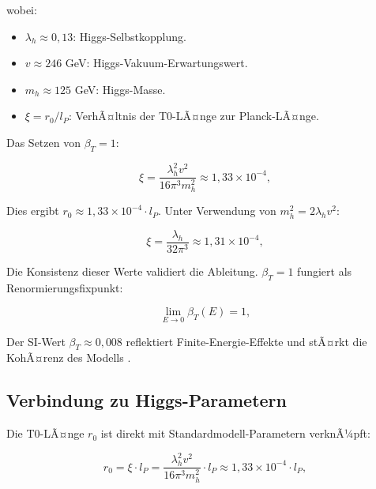 ﻿\documentclass[twocolumn,aps,prl]{revtex4-2}
\begin{document}
{{{{{{{{{										wobei:
										\begin{itemize}
											\item \(\lambda_h \approx 0{,}13\): Higgs-Selbstkopplung.
											\item \(v \approx 246\) GeV: Higgs-Vakuum-Erwartungswert.
											\item \(m_h \approx 125\) GeV: Higgs-Masse.
											\item \(\xi = r_0/l_P\): VerhÃ¤ltnis der T0-LÃ¤nge zur Planck-LÃ¤nge.
										\end{itemize}
										
										Das Setzen von \(\beta_T = 1\):
										
										\begin{equation}
											\xi = \frac{\lambda_h^2 v^2}{16 \pi^3 m_h^2} \approx 1{,}33 \times 10^{-4}, \label{eq:xi_value}
										\end{equation}
										
										Dies ergibt \(r_0 \approx 1{,}33 \times 10^{-4} \cdot l_P\). Unter Verwendung von \(m_h^2 = 2 \lambda_h v^2\):
										
										\begin{equation}
											\xi = \frac{\lambda_h}{32 \pi^3} \approx 1{,}31 \times 10^{-4}, \label{eq:xi_alt}
										\end{equation}
										
										Die Konsistenz dieser Werte validiert die Ableitung. \(\beta_T = 1\) fungiert als Renormierungsfixpunkt:
										
										\begin{equation}
											\lim_{E \to 0} \beta_T(E) = 1, \label{eq:beta_limit}
										\end{equation}
										
										Der SI-Wert \(\beta_T \approx 0{,}008\) reflektiert Finite-Energie-Effekte und stÃ¤rkt die KohÃ¤renz des Modells \cite{pascher_beta_2025}.
										
										\subsection{Verbindung zu Higgs-Parametern}
										\label{subsec:higgs}
										
										Die T0-LÃ¤nge \(r_0\) ist direkt mit Standardmodell-Parametern verknÃ¼pft:
										
										\begin{equation}
											r_0 = \xi \cdot l_P = \frac{\lambda_h^2 v^2}{16 \pi^3 m_h^2} \cdot l_P \approx 1{,}33 \times 10^{-4} \cdot l_P, \label{eq:r0_higgs}
										\end{equation}
										
}}}}}}}}}
\end{document}
